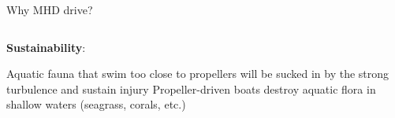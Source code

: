 \documentclass[mathserif]{beamer}
\begin{document}
\begin{frame}[t]{}
\begin{columns}[T]
\begin{column}{0.65\textwidth}
\begin{block}{Why MHD drive?}
				\begin{center}
				\end{center}
				\begin{columns}[T]
					\begin{column}{0.5\textwidth}
				{\huge \textbf{Sustainability}:}
				\begin{outline}
					\1 Aquatic fauna that swim too close to propellers will be sucked in by the strong turbulence and sustain injury
					\1 Propeller-driven boats destroy aquatic flora in shallow waters (seagrass, corals, etc.)		
					\begin{center}
\end{center}
\end{outline}
\end{column}
\end{columns}
\end{block}
\end{column}
\end{columns}
\end{frame}
\end{document}
